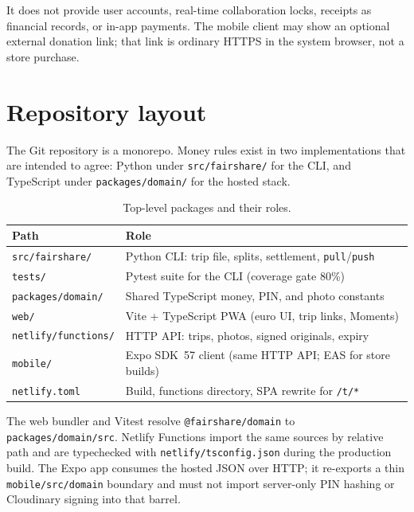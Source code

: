 \documentclass[11pt,a4paper]{article}
\newcommand{\code}[1]{\texttt{#1}}
\begin{document}
It does not provide user accounts, real-time collaboration locks, receipts as financial records, or in-app payments.
The mobile client may show an optional external donation link; that link is ordinary HTTPS in the system browser, not a store purchase.

\section{Repository layout}

The Git repository is a monorepo.
Money rules exist in two implementations that are intended to agree: Python under \code{src/fairshare/} for the CLI, and TypeScript under \code{packages/domain/} for the hosted stack.

\begin{table}[ht]
\centering
\caption{Top-level packages and their roles.}
\label{tab:layout}
\begin{tabular}{@{}ll@{}}
\toprule
Path & Role \\
\midrule
\code{src/fairshare/} & Python CLI: trip file, splits, settlement, \code{pull}/\code{push} \\
\code{tests/} & Pytest suite for the CLI (coverage gate 80\%) \\
\code{packages/domain/} & Shared TypeScript money, PIN, and photo constants \\
\code{web/} & Vite + TypeScript PWA (euro UI, trip links, Moments) \\
\code{netlify/functions/} & HTTP API: trips, photos, signed originals, expiry \\
\code{mobile/} & Expo SDK~57 client (same HTTP API; EAS for store builds) \\
\code{netlify.toml} & Build, functions directory, SPA rewrite for \code{/t/*} \\
\bottomrule
\end{tabular}
\end{table}

The web bundler and Vitest resolve \code{@fairshare/domain} to \code{packages/domain/src}.
Netlify Functions import the same sources by relative path and are typechecked with \code{netlify/tsconfig.json} during the production build.
The Expo app consumes the hosted JSON over HTTP; it re-exports a thin \code{mobile/src/domain} boundary and must not import server-only PIN hashing or Cloudinary signing into that barrel.
\end{document}
